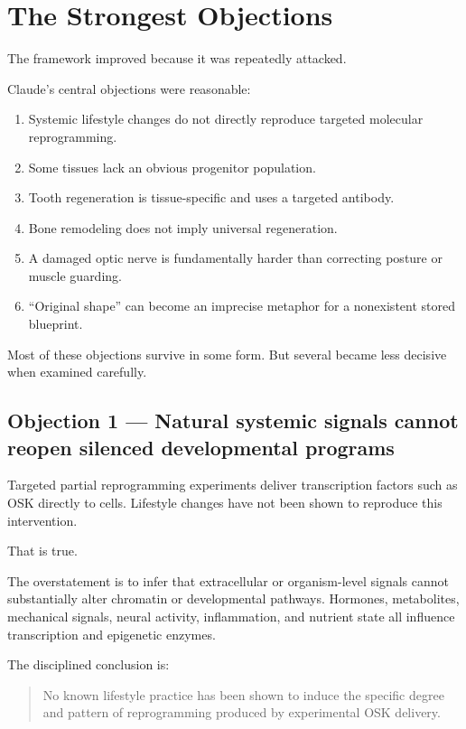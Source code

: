\chapter{The Strongest Objections}

The framework improved because it was repeatedly attacked.

Claude's central objections were reasonable:

\begin{enumerate}
\def\labelenumi{\arabic{enumi}.}
\tightlist
\item
  Systemic lifestyle changes do not directly reproduce targeted molecular reprogramming.
\item
  Some tissues lack an obvious progenitor population.
\item
  Tooth regeneration is tissue-specific and uses a targeted antibody.
\item
  Bone remodeling does not imply universal regeneration.
\item
  A damaged optic nerve is fundamentally harder than correcting posture or muscle guarding.
\item
  ``Original shape'' can become an imprecise metaphor for a nonexistent stored blueprint.
\end{enumerate}

Most of these objections survive in some form. But several became less decisive when examined carefully.

\section{Objection 1 --- Natural systemic signals cannot reopen silenced developmental programs}

Targeted partial reprogramming experiments deliver transcription factors such as OSK directly to cells. Lifestyle changes have not been shown to reproduce this intervention.

That is true.

The overstatement is to infer that extracellular or organism-level signals cannot substantially alter chromatin or developmental pathways. Hormones, metabolites, mechanical signals, neural activity, inflammation, and nutrient state all influence transcription and epigenetic enzymes.

The disciplined conclusion is:

\begin{quote}
No known lifestyle practice has been shown to induce the specific degree and pattern of reprogramming produced by experimental OSK delivery.
\end{quote}


